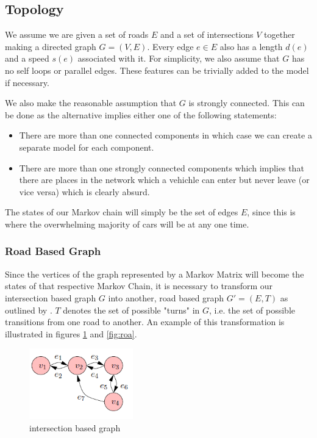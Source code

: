 \documentclass[a4paper]{article}
\begin{document}
\subsection{Topology}
We assume we are given a set of roads $E$ and a set of intersections $V$ together making a directed graph $G = (V, E)$.
Every edge $e \in E$ also has a length $d(e)$ and a speed $s(e)$ associated with it.
For simplicity, we also assume that $G$ has no self loops or parallel edges. These features can be trivially added to the model if necessary.

We also make the reasonable assumption that $G$ is strongly connected.
This can be done as the alternative implies either one of the following statements:
\begin{itemize}
	\item There are more than one connected components in which case we can create a separate model for each component.
	\item There are more than one strongly connected components which implies that there are places in the network which 
		a vehichle can enter but never leave (or vice versa) which is clearly absurd.
\end{itemize}

The states of our Markov chain will simply be the set of edges $E$, since this is where the overwhelming majority of cars will be at any one time.

\subsubsection{Road Based Graph}
Since the vertices of the graph represented by a Markov Matrix will become the states of that respective Markov Chain, it is necessary to 
transform our intersection based graph $G$ into another, road based graph $G' = (E, T)$ as outlined by \cite{volk}. 
$T$ denotes the set of possible "turns" in $G$, i.e. the set of possible transitions from one road to another.
An example of this transformation is illustrated in figures \ref{fig:int} and \ref{fig:roa}.

\begin{figure}[h]
    \centering
    \includegraphics[width=0.4\textwidth]{intersection.PNG}
    \caption{intersection based graph}
    \label{fig:int}
\end{figure}
\end{document}
